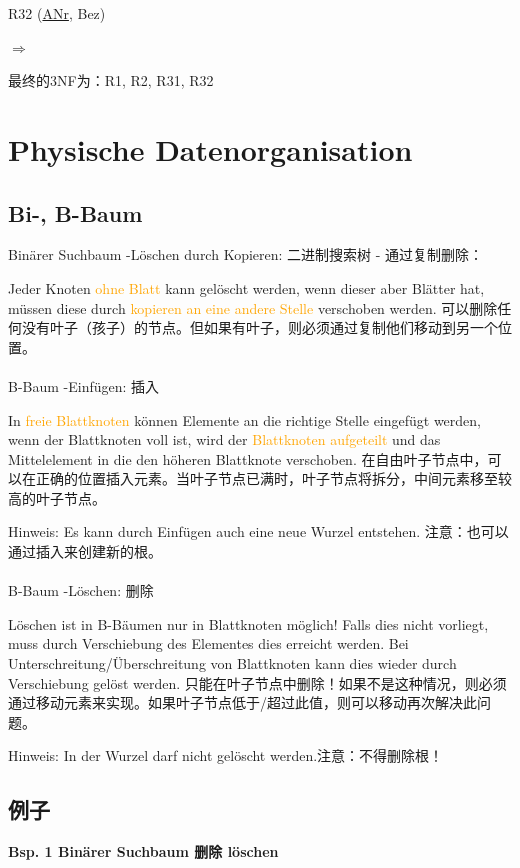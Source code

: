 \documentclass[fleqn]{article}
\begin{document}
R32 (\underline{ANr}, Bez)

\textbf{$\Rightarrow$}

最终的3NF为：R1, R2, R31, R32

\section{Physische Datenorganisation}

\subsection{Bi-, B-Baum}

\noindent Binärer Suchbaum -Löschen durch Kopieren: 二进制搜索树 - 通过复制删除：

Jeder Knoten \textcolor{orange}{ohne Blatt} kann gelöscht werden, wenn dieser aber Blätter hat, müssen diese durch \textcolor{orange}{kopieren an eine andere Stelle} verschoben werden.
可以删除任何没有叶子（孩子）的节点。但如果有叶子，则必须通过复制他们移动到另一个位置。
\\
\\
B-Baum -Einfügen: 插入

In \textcolor{orange}{freie Blattknoten} können Elemente an die richtige Stelle eingefügt werden, wenn der Blattknoten voll ist, wird der \textcolor{orange}{Blattknoten aufgeteilt} und das Mittelelement in die den höheren Blattknote verschoben.
在自由叶子节点中，可以在正确的位置插入元素。当叶子节点已满时，叶子节点将拆分，中间元素移至较高的叶子节点。

Hinweis: Es kann durch Einfügen auch eine neue Wurzel entstehen.
注意：也可以通过插入来创建新的根。
\\
\\
B-Baum -Löschen: 删除

Löschen ist in B-Bäumen nur in Blattknoten möglich! Falls dies nicht vorliegt, muss durch Verschiebung des Elementes dies erreicht werden. Bei Unterschreitung/Überschreitung von Blattknoten kann dies wieder durch Verschiebung gelöst werden.
只能在叶子节点中删除！如果不是这种情况，则必须通过移动元素来实现。如果叶子节点低于/超过此值，则可以移动再次解决此问题。

Hinweis: In der Wurzel darf nicht gelöscht werden.注意：不得删除根！

\subsection{例子}

\noindent\textbf{Bsp. 1 Binärer Suchbaum 删除 löschen}
\end{document}
